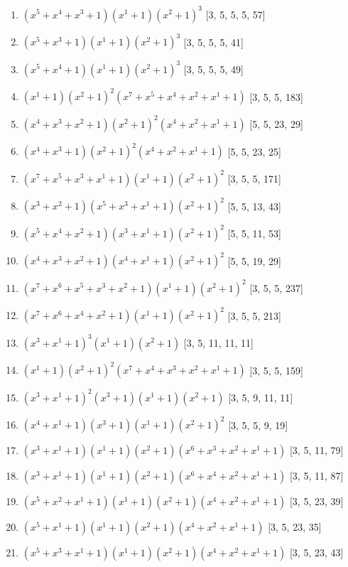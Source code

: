 \documentclass[10pt,twocolumn]{article}
\begin{document}
\begin{enumerate}
\item $(x^{5} + x^{4} + x^{3} + 1)(x^{1} + 1)(x^{2} + 1)^{3}$  [3, 5, 5, 5, 57]
\item $(x^{5} + x^{3} + 1)(x^{1} + 1)(x^{2} + 1)^{3}$  [3, 5, 5, 5, 41]
\item $(x^{5} + x^{4} + 1)(x^{1} + 1)(x^{2} + 1)^{3}$  [3, 5, 5, 5, 49]
\item $(x^{1} + 1)(x^{2} + 1)^{2}(x^{7} + x^{5} + x^{4} + x^{2} + x^{1} + 1)$  [3, 5, 5, 183]
\item $(x^{4} + x^{3} + x^{2} + 1)(x^{2} + 1)^{2}(x^{4} + x^{2} + x^{1} + 1)$  [5, 5, 23, 29]
\item $(x^{4} + x^{3} + 1)(x^{2} + 1)^{2}(x^{4} + x^{2} + x^{1} + 1)$  [5, 5, 23, 25]
\item $(x^{7} + x^{5} + x^{3} + x^{1} + 1)(x^{1} + 1)(x^{2} + 1)^{2}$  [3, 5, 5, 171]
\item $(x^{3} + x^{2} + 1)(x^{5} + x^{3} + x^{1} + 1)(x^{2} + 1)^{2}$  [5, 5, 13, 43]
\item $(x^{5} + x^{4} + x^{2} + 1)(x^{3} + x^{1} + 1)(x^{2} + 1)^{2}$  [5, 5, 11, 53]
\item $(x^{4} + x^{3} + x^{2} + 1)(x^{4} + x^{1} + 1)(x^{2} + 1)^{2}$  [5, 5, 19, 29]
\item $(x^{7} + x^{6} + x^{5} + x^{3} + x^{2} + 1)(x^{1} + 1)(x^{2} + 1)^{2}$  [3, 5, 5, 237]
\item $(x^{7} + x^{6} + x^{4} + x^{2} + 1)(x^{1} + 1)(x^{2} + 1)^{2}$  [3, 5, 5, 213]
\item $(x^{3} + x^{1} + 1)^{3}(x^{1} + 1)(x^{2} + 1)$  [3, 5, 11, 11, 11]
\item $(x^{1} + 1)(x^{2} + 1)^{2}(x^{7} + x^{4} + x^{3} + x^{2} + x^{1} + 1)$  [3, 5, 5, 159]
\item $(x^{3} + x^{1} + 1)^{2}(x^{3} + 1)(x^{1} + 1)(x^{2} + 1)$  [3, 5, 9, 11, 11]
\item $(x^{4} + x^{1} + 1)(x^{3} + 1)(x^{1} + 1)(x^{2} + 1)^{2}$  [3, 5, 5, 9, 19]
\item $(x^{3} + x^{1} + 1)(x^{1} + 1)(x^{2} + 1)(x^{6} + x^{3} + x^{2} + x^{1} + 1)$  [3, 5, 11, 79]
\item $(x^{3} + x^{1} + 1)(x^{1} + 1)(x^{2} + 1)(x^{6} + x^{4} + x^{2} + x^{1} + 1)$  [3, 5, 11, 87]
\item $(x^{5} + x^{2} + x^{1} + 1)(x^{1} + 1)(x^{2} + 1)(x^{4} + x^{2} + x^{1} + 1)$  [3, 5, 23, 39]
\item $(x^{5} + x^{1} + 1)(x^{1} + 1)(x^{2} + 1)(x^{4} + x^{2} + x^{1} + 1)$  [3, 5, 23, 35]
\item $(x^{5} + x^{3} + x^{1} + 1)(x^{1} + 1)(x^{2} + 1)(x^{4} + x^{2} + x^{1} + 1)$  [3, 5, 23, 43]

\end{enumerate}
\end{document}
